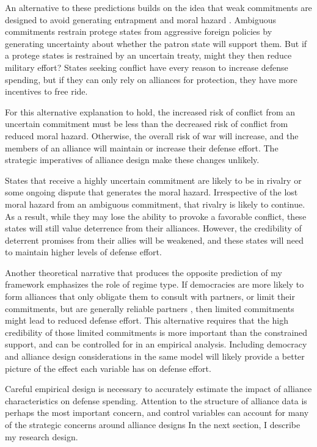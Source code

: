 \documentclass[12pt]{article}
\begin{document}
An alternative to these predictions builds on the idea that weak commitments are designed to avoid generating entrapment and moral hazard \citep{Benson2012}. Ambiguous commitments restrain protege states from aggressive foreign policies by generating uncertainty about whether the patron state will support them. But if a protege states is restrained by an uncertain treaty, might they then reduce military effort? States seeking conflict have every reason to increase defense spending, but if they can only rely on alliances for protection, they have more incentives to free ride. 

For this alternative explanation to hold, the increased risk of conflict from an uncertain commitment must be less than the decreased risk of conflict from reduced moral hazard. Otherwise, the overall risk of war will increase, and the members of an alliance will maintain or increase their defense effort. The strategic imperatives of alliance design make these changes unlikely. 

States that receive a highly uncertain commitment are likely to be in rivalry or some ongoing dispute that generates the moral hazard. Irrespective of the lost moral hazard from an ambiguous commitment, that rivalry is likely to continue. As a result, while they may lose the ability to provoke a favorable conflict, these states will still value deterrence from their alliances. However, the credibility of deterrent promises from their allies will be weakened, and these states will need to maintain higher levels of defense effort.

Another theoretical narrative that produces the opposite prediction of my framework emphasizes the role of regime type. If democracies are more likely to form alliances that only obligate them to consult with partners, or limit their commitments, but are generally reliable partners \citep{Chibaetal2015, DigiuseppePoast2016}, then limited commitments might lead to reduced defense effort. This alternative requires that the high credibility of those limited commitments is more important than the constrained support, and can be controlled for in an empirical analysis. Including democracy and alliance design considerations in the same model will likely provide a better picture of the effect each variable has on defense effort. 

Careful empirical design is necessary to accurately estimate the impact of alliance characteristics on defense spending. Attention to the structure of alliance data is perhaps the most important concern, and control variables can account for many of the strategic concerns around alliance designs In the next section, I describe my research design. 
 
\end{document}
